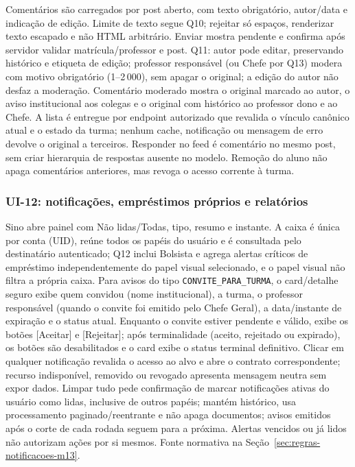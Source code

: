 Comentários são carregados por post aberto, com texto obrigatório, autor/data e indicação de edição. Limite de texto segue Q10; rejeitar só espaços, renderizar texto escapado e não HTML arbitrário. Enviar mostra pendente e confirma após servidor validar matrícula/professor e post. Q11: autor pode editar, preservando histórico e etiqueta de edição; professor responsável (ou Chefe por Q13) modera com motivo obrigatório (1--2\,000), sem apagar o original; a edição do autor não desfaz a moderação. Comentário moderado mostra o original marcado ao autor, o aviso institucional aos colegas e o original com histórico ao professor dono e ao Chefe. A lista é entregue por endpoint autorizado que revalida o vínculo canônico atual e o estado da turma; nenhum cache, notificação ou mensagem de erro devolve o original a terceiros. Responder no feed é comentário no mesmo post, sem criar hierarquia de respostas ausente no modelo. Remoção do aluno não apaga comentários anteriores, mas revoga o acesso corrente à turma.

\subsubsection{UI-12: notificações, empréstimos próprios e relatórios}
Sino abre painel com Não lidas/Todas, tipo, resumo e instante. A caixa é única por conta (UID), reúne todos os papéis do usuário e é consultada pelo destinatário autenticado; Q12 inclui Bolsista e agrega alertas críticos de empréstimo independentemente do papel visual selecionado, e o papel visual não filtra a própria caixa. Para avisos do tipo \texttt{CONVITE\_PARA\_TURMA}, o card/detalhe seguro exibe quem convidou (nome institucional), a turma, o professor responsável (quando o convite foi emitido pelo Chefe Geral), a data/instante de expiração e o status atual. Enquanto o convite estiver pendente e válido, exibe os botões [Aceitar] e [Rejeitar]; após terminalidade (aceito, rejeitado ou expirado), os botões são desabilitados e o card exibe o status terminal definitivo. Clicar em qualquer notificação revalida o acesso ao alvo e abre o contrato correspondente; recurso indisponível, removido ou revogado apresenta mensagem neutra sem expor dados. Limpar tudo pede confirmação de marcar notificações ativas do usuário como lidas, inclusive de outros papéis; mantém histórico, usa processamento paginado/reentrante e não apaga documentos; avisos emitidos após o corte de cada rodada seguem para a próxima. Alertas vencidos ou já lidos não autorizam ações por si mesmos. Fonte normativa na Seção~\ref{sec:regras-notificacoes-m13}.

